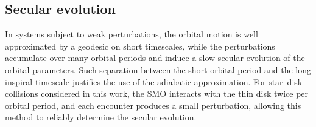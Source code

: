 \documentclass[aps,prx,reprint,superscriptaddress,nofootinbib,longbibliography]{revtex4-1}
\begin{document}
\subsection{Secular evolution}\label{sec:secular evolution}
In systems subject to weak perturbations, the orbital motion is well approximated by a geodesic on short timescales, while the perturbations accumulate over many orbital periods and induce a slow secular evolution of the orbital parameters. Such separation between the short orbital period and the long inspiral timescale justifies the use of the adiabatic approximation. For star–disk collisions considered in this work, the SMO interacts with the thin disk twice per orbital period, and each encounter produces a small perturbation, allowing this method to reliably determine the secular evolution.\par
\end{document}
